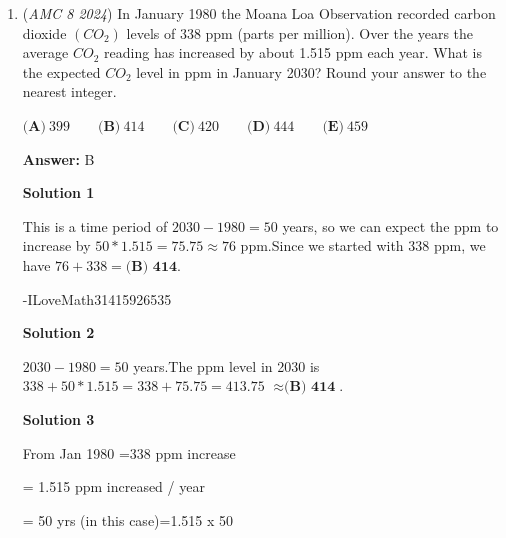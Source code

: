 \begin{enumerate}
 -Benedict T (countmath1) and anabel.disher

 


 



\textbf{Solution 3}

This solution is similar to Solution 1. The most simplest and effective way to solve this problem is equations. We have the following equations: 

 2r=gand 2g=bWe essentialy want to find out the total number of mables in Maria's collection or in equation terms (r+g+b). Converting that equation and substituting the values we get r+2r+4r=7r Now, we know the total is a multiple of 7 leaving our answer as $\boxed{\textbf{(E) 28}}.$ -AADHYA2012

 


 


	\item (\textit{AMC 8 2024}) In January 1980 the Moana Loa Observation recorded carbon dioxide $(CO_2)$ levels of 338 ppm (parts per million). Over the years the average $CO_2$ reading has increased by about 1.515 ppm each year. What is the expected $CO_2$ level in ppm in January 2030? Round your answer to the nearest integer.


 $\textbf{(A)}\ 399 \qquad \textbf{(B)}\ 414 \qquad \textbf{(C)}\ 420 \qquad \textbf{(D)}\ 444 \qquad \textbf{(E)}\ 459$

 \textbf{Answer: }B



\textbf{Solution 1}

This is a time period of $2030 - 1980 = 50$ years, so we can expect the ppm to increase by $50*1.515=75.75\approx	76$ ppm.Since we started with $338$ ppm, we have $76+338=\boxed{\textbf{(B)\ 414}}$.

 -ILoveMath31415926535

 



\textbf{Solution 2}

$2030 - 1980 = 50$ years.The ppm level in 2030 is $338 + 50 * 1.515 = 338 + 75.75 = 413.75$ $\approx	\boxed{\textbf{(B)\ 414}}$.

 



\textbf{Solution 3}

From Jan 1980 =338 ppm increase

 = 1.515 ppm increased / year

 = 50 yrs (in this case)=1.515 x 50 


\end{enumerate}

